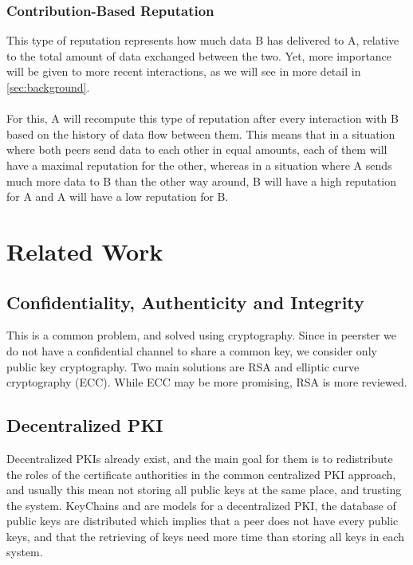 \documentclass[]{article}
\begin{document}
\subsubsection{Contribution-Based Reputation}
This type of reputation represents how much data B has delivered to A, relative to the total amount of data exchanged between the two.
Yet, more importance will be given to more recent interactions, as we will see in more detail in \ref{sec:background}.
\\\\
For this, A will recompute this type of reputation after every interaction with B based on the history of data flow between them.
This means that in a situation where both peers send data to each other in equal amounts, each of them will have a maximal reputation for the other, whereas in a situation where A sends much more data to B than the other way around, B will have a high reputation for A and A will have a low reputation for B.

\section{Related Work}

\subsection{Confidentiality, Authenticity and Integrity}
This is a common problem, and solved using cryptography. Since in peerster we do not have a confidential channel to share a common key, we consider only public key cryptography. Two main solutions are RSA \cite{RFC8017} and elliptic curve cryptography (ECC). While ECC may be more promising, RSA is more reviewed.

\subsection{Decentralized PKI}
Decentralized PKIs already exist, and the main goal for them is to redistribute the roles of the certificate authorities in the common centralized PKI approach, and usually this mean not storing all public keys at the same place, and trusting the system. KeyChains \cite{morselli2006keychains} and \cite{aberer2005decentralised} are models for a decentralized PKI, the database of public keys are distributed which implies that a peer does not have every public keys, and that the retrieving of keys need more time than storing all keys in each system.
\end{document}
